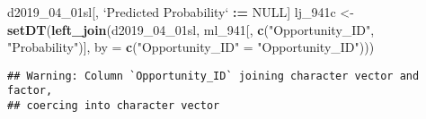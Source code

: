 \documentclass[]{article}
\newenvironment{Shaded}{\begin{snugshade}}{\end{snugshade}}
\newcommand{\DataTypeTok}[1]{\textcolor[rgb]{0.13,0.29,0.53}{#1}}
\newcommand{\DecValTok}[1]{\textcolor[rgb]{0.00,0.00,0.81}{#1}}
\newcommand{\ErrorTok}[1]{\textcolor[rgb]{0.64,0.00,0.00}{\textbf{#1}}}
\newcommand{\KeywordTok}[1]{\textcolor[rgb]{0.13,0.29,0.53}{\textbf{#1}}}
\newcommand{\NormalTok}[1]{#1}
\newcommand{\OperatorTok}[1]{\textcolor[rgb]{0.81,0.36,0.00}{\textbf{#1}}}
\newcommand{\OtherTok}[1]{\textcolor[rgb]{0.56,0.35,0.01}{#1}}
\newcommand{\StringTok}[1]{\textcolor[rgb]{0.31,0.60,0.02}{#1}}
\begin{document}
\begin{Shaded}
\begin{Highlighting}[]
\NormalTok{d2019_}\DecValTok{04}\NormalTok{_01sl[, }\StringTok{`}\DataTypeTok{Predicted Probability}\StringTok{`} \OperatorTok{:}\ErrorTok{=}\StringTok{ }\OtherTok{NULL}\NormalTok{]}
\NormalTok{lj_941c <-}\StringTok{ }\KeywordTok{setDT}\NormalTok{(}\KeywordTok{left_join}\NormalTok{(d2019_}\DecValTok{04}\NormalTok{_01sl, ml_}\DecValTok{941}\NormalTok{[, }\KeywordTok{c}\NormalTok{(}\StringTok{"Opportunity_ID"}\NormalTok{, }\StringTok{"Probability"}\NormalTok{)], }\DataTypeTok{by =} \KeywordTok{c}\NormalTok{(}\StringTok{"Opportunity_ID"}\NormalTok{ =}\StringTok{ "Opportunity_ID"}\NormalTok{)))}
\end{Highlighting}
\end{Shaded}

\begin{verbatim}
## Warning: Column `Opportunity_ID` joining character vector and factor,
## coercing into character vector
\end{verbatim}

\begin{Shaded}
\end{Shaded}
\end{document}
